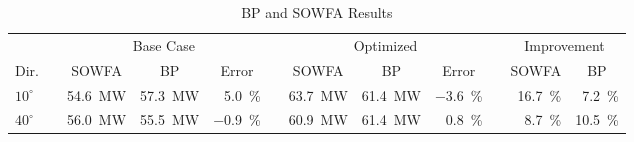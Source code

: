 \documentclass[conf]{new-aiaa}
\begin{document}
\begin{table}[htpb!]\centering
\caption{BP and SOWFA Results}\label{tab:opt-results}
\begin{tabular}{@{}lcrrrcrrrcrr@{}}\toprule
& \phantom{a} &\multicolumn{3}{c}{Base Case} &\phantom{a}& \multicolumn{3}{c}{Optimized} &\phantom{a}& \multicolumn{2}{c}{Improvement}\\ 
\cmidrule{3-5} \cmidrule{7-9} \cmidrule{11-12}

\multicolumn{1}{l}{Dir.} & \phantom{a} & \multicolumn{1}{c}{SOWFA} & \multicolumn{1}{c}{BP} & \multicolumn{1}{c}{Error} & \phantom{a} & \multicolumn{1}{c}{SOWFA} & \multicolumn{1}{c}{BP} & \multicolumn{1}{c}{Error} & \phantom{a} & \multicolumn{1}{c}{SOWFA} & \multicolumn{1}{c}{BP} \\ 
\cmidrule{1-1} \cmidrule{3-5} \cmidrule{7-9} \cmidrule{11-12}


\multicolumn{1}{l}{$10^{\circ}$} & & \SI[per-mode=symbol]{54.6}{\mega\watt} &\SI[per-mode=symbol]{57.3}{\mega\watt} &\SI[per-mode=symbol]{5.0}{\percent} & &\SI[per-mode=symbol]{63.7}{\mega\watt} &\SI[per-mode=symbol]{61.4}{\mega\watt} &\SI[per-mode=symbol]{-3.6}{\percent} & &\SI[per-mode=symbol]{16.7}{\percent} &\SI[per-mode=symbol]{7.2}{\percent} \\


\multicolumn{1}{l}{$40^{\circ}$} & & \SI[per-mode=symbol]{56.0}{\mega\watt} &\SI[per-mode=symbol]{55.5}{\mega\watt} &\SI[per-mode=symbol]{-0.9}{\percent} & &\SI[per-mode=symbol]{60.9}{\mega\watt} &\SI[per-mode=symbol]{61.4}{\mega\watt} &\SI[per-mode=symbol]{0.8}{\percent} & &\SI[per-mode=symbol]{8.7}{\percent} &\SI[per-mode=symbol]{10.5}{\percent} \\



\end{tabular}
\end{table}
\end{document}
